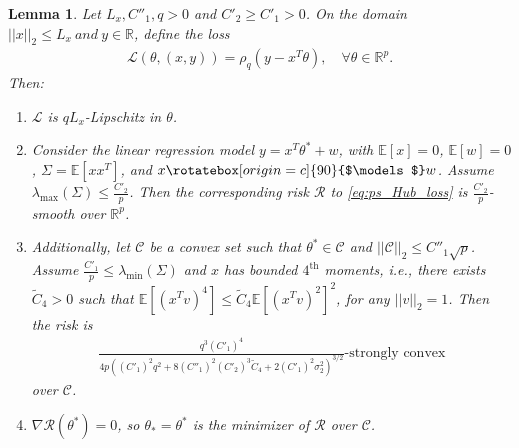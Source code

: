 \documentclass{article}
\newtheorem{lemma}{Lemma}
\newcommand{\indep}{\rotatebox[origin=c]{90}{$\models$}}
\begin{document}
\begin{lemma}
\label{lemma:pHu_prelim}
Let $L_x, C''_1, q > 0$ and $C'_2 \geq C'_1 > 0$. On the domain $||x||_2 \leq L_x \ and \ y \in \mathbb{R}$, define the loss
\begin{align}
\label{eq:ps_Hub_loss}
\mathcal{L}(\theta, (x, y)) = \rho_q(y - x^T\theta), \quad \forall \theta \in \mathbb{R}^p.
\end{align}
Then:
\begin{enumerate}
\item $\mathcal{L}$ is $qL_x$-Lipschitz in $\theta$.

\item Consider the linear regression model $y = x^T\theta^* + w$, with $\mathbb{E}[x] = 0$, $\mathbb{E}[w] = 0$, $\Sigma = \mathbb{E}[xx^T]$, and $x \indep w$. Assume $\lambda_{\max}(\Sigma) \leq \frac{C'_2}{p}$. Then the corresponding risk $\mathcal{R}$ to \eqref{eq:ps_Hub_loss} is $\frac{C'_2}{p}$-smooth over $\mathbb{R}^p$. 

\item Additionally, let $\mathcal{C}$ be a convex set such that $\theta^* \in \mathcal{C}$ and $||\mathcal{C}||_2 \leq C''_1\sqrt{p}$. Assume $\frac{C'_1}{p} \leq \lambda_{\min}(\Sigma)$ and $x$ has bounded $4^{\text{th}}$ moments, i.e., there exists $\widetilde{C}_4 > 0$ such that $\mathbb{E}\left[(x^Tv)^4\right] \leq \widetilde{C}_4\mathbb{E}\left[(x^Tv)^2\right]^2$, for any $||v||_2 = 1$. Then the risk is 
\begin{align*}
\frac{q^3(C'_1)^4}{4p\left((C'_1)^2q^2 + 8(C''_1)^2(C'_2)^3\widetilde{C}_4 + 2(C'_1)^2\sigma_2^2\right)^{3/2}}\mbox{-strongly convex}
\end{align*}
over $\mathcal{C}$. 

\item $\nabla\mathcal{R}(\theta^*) = 0$, so $\theta_{*} = \theta^*$ is the minimizer of $\mathcal{R}$ over $\mathcal{C}$.
\end{enumerate}
\end{lemma}
\end{document}
